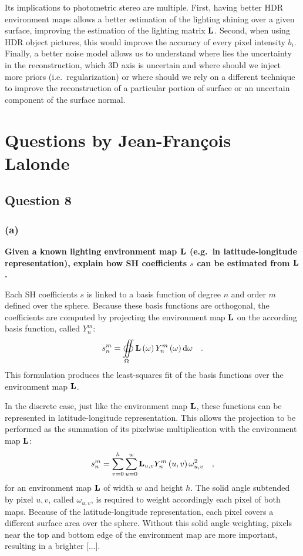 \documentclass{report}
\begin{document}
Its implications to photometric stereo are multiple. First, having better HDR environment maps allows a better estimation of the lighting shining over a given surface, improving the estimation of the lighting matrix $\mathbf{L}$. Second, when using HDR object pictures, this would improve the accuracy of every pixel intensity $b_i$. Finally, a better noise model allows us to understand where lies the uncertainty in the reconstruction, which 3D axis is uncertain and where should we inject more priors (i.e.\ regularization) or where should we rely on a different technique to improve the reconstruction of a particular portion of surface or an uncertain component of the surface normal.

\chapter{Questions by Jean-François Lalonde}

\section{Question 8}
\subsection{(a)}
\textbf{Given a known lighting environment map $\mathbf{L}$ (e.g.\ in latitude-longitude representation), explain how SH coefficients $s$ can be estimated from $\mathbf{L}$.}

Each SH coefficients $s$ is linked to a basis function of degree $n$ and order $m$ defined over the sphere. Because these basis functions are orthogonal, the coefficients are computed by projecting the environment map $\mathbf{L}$ on the according basis function, called $Y_n^m$:
\begin{equation}
s_n^m = \oiint\limits_{\Omega} \mathbf{L}\left(\mathbf{\omega} \right) Y_n^m \left( \mathbf{\omega} \right) \mathrm{d} \mathbf{\omega}   \quad.
\end{equation}
This formulation produces the least-squares fit of the basis functions over the environment map $\mathbf{L}$.

In the discrete case, just like the environment map $\mathbf{L}$, these functions can be represented in latitude-longitude representation. This allows the projection to be performed as the summation of its pixelwise multiplication with the environment map $\mathbf{L}$:
\begin{equation}
s_n^m = \sum_{v=0}^{h} \sum_{u=0}^{w} \mathbf{L}_{u,v} Y_n^m\left(u, v\right) \omega_{u,v}^2 \quad,
\end{equation}
for an environment map $\mathbf{L}$ of width $w$ and height $h$. The solid angle subtended by pixel $u,v$, called $\omega_{u,v}$, is required to weight accordingly each pixel of both maps. Because of the latitude-longitude representation, each pixel covers a different surface area over the sphere. Without this solid angle weighting, pixels near the top and bottom edge of the environment map are more important, resulting in a brighter  [...].
\end{document}
